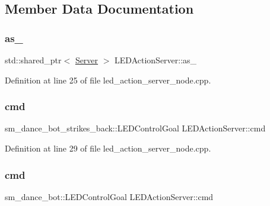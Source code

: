 \subsection{Member Data Documentation}
\mbox{\label{classLEDActionServer_a61d21c77642081acf017d4ebd65b2de0}} 
\subsubsection{\texorpdfstring{as\+\_\+}{as\_}}
{\footnotesize\ttfamily std\+::shared\+\_\+ptr$<$ \hyperlink{odom__tracker__node_8cpp_a9884574d0480319430f628f79afc0500}{Server} $>$ L\+E\+D\+Action\+Server\+::as\+\_\+}



Definition at line 25 of file led\+\_\+action\+\_\+server\+\_\+node.\+cpp.

\mbox{\label{classLEDActionServer_a219e3a4ae2a09887d601bc9b210294dd}} 
\subsubsection{\texorpdfstring{cmd}{cmd}\hspace{0.1cm}{\footnotesize\ttfamily [1/2]}}
{\footnotesize\ttfamily sm\+\_\+dance\+\_\+bot\+\_\+strikes\+\_\+back\+::\+L\+E\+D\+Control\+Goal L\+E\+D\+Action\+Server\+::cmd}



Definition at line 29 of file led\+\_\+action\+\_\+server\+\_\+node.\+cpp.

\mbox{\label{classLEDActionServer_a4d3a4c07e7659cdd78228932bb1634d3}} 
\subsubsection{\texorpdfstring{cmd}{cmd}\hspace{0.1cm}{\footnotesize\ttfamily [2/2]}}
{\footnotesize\ttfamily sm\+\_\+dance\+\_\+bot\+::\+L\+E\+D\+Control\+Goal L\+E\+D\+Action\+Server\+::cmd}



